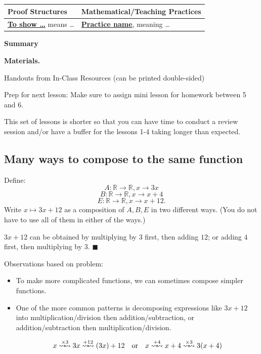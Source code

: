 \documentclass[11pt]{article}
\newcommand\header[1]{\vspace*{4pt}\par {\large {\bf #1}}\par}
\newenvironment{bignote}[1][Instructor note]%
	{\begin{mdframed}\raggedright{\bf #1.~}}
	{\end{mdframed}}
\newenvironment{task}
	{\begin{mdframed}[linecolor=lightgray, linewidth=3pt]\raggedright}
	{\end{mdframed}}
\newcommand\tn{\textnormal}
\newcommand{\R}{\mathbb{R}}
\renewcommand\emph[1]{\underline{\bf{#1}}} %
\theoremstyle{definition}
\newenvironment{solution}{{\it Solution.} }{\hfill {\color{lightgray}$\blacksquare$}}
\begin{document}
\begin{tabular}{L{3.2in}|L{3.2in}}
{\bf Proof Structures} & {\bf Mathematical/Teaching Practices} \\ 
\hline \parskip4pt
\emph{To show \dots} means \dots 
&
\emph{Practice name}, meaning \dots
\end{tabular}
\header{Summary}
\begin{bignote}[Materials]
\begin{itemize*}
\item Handouts from In-Class Resources (can be printed double-sided)
\end{itemize*}
\end{bignote}

Prep for next lesson:
Make sure to assign mini lesson for homework between 5 and 6. 

This set of lessons is shorter so that you can have time to conduct a review session and/or have a buffer for the lessons 1-4 taking longer than expected.

\newpage
\subsection{Many ways to compose to the same function}

\begin{task}
Define:
$$A:\R\to \R, x\to 3x$$
$$B:\R\to \R, x\to x+4$$
$$E:\R\to\R, x\to x+12.$$
Write $x\mapsto 3x+12$ as a composition of $A, B, E$ in two different ways. (You do not have to use all of them in either of the ways.)
\end{task} 

\begin{solution}
$3x+12$ can be obtained by multiplying by $3$ first, then adding $12$; or adding $4$ first, then multiplying by $3$. 
\end{solution}

Observations based on problem:

\begin{itemize}
\item To make more complicated functions, we can sometimes compose simpler functions.
\item One of the more common patterns is decomposing expressions like $3x+12$ into multiplication/division then addition/subtraction, or addition/subtraction then multiplication/division.


	$$x \stackrel{\times 3}{\rightsquigarrow\!\!\rightsquigarrow} 3x \stackrel{+12}{\rightsquigarrow\!\!\rightsquigarrow}  (3x)+12 \tn{\quad or\quad} x \stackrel{+4}{\rightsquigarrow\!\!\rightsquigarrow}  x+4 \stackrel{\times 3}{\rightsquigarrow\!\!\rightsquigarrow} 3(x+4)$$  
\end{itemize}
\end{document}
